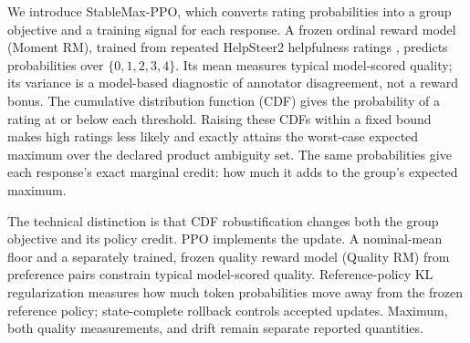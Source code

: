 \documentclass{article}
\newcommand{\method}{StableMax-PPO}
\theoremstyle{definition}
\theoremstyle{remark}
\begin{document}
We introduce \method{}, which converts rating probabilities into a group
objective and a training signal for each response. A frozen ordinal reward
model (Moment RM), trained from repeated HelpSteer2 helpfulness ratings
\citep{wang2024helpsteer2}, predicts probabilities over \(\{0,1,2,3,4\}\).
Its mean measures typical model-scored quality; its variance is a model-based
diagnostic of annotator disagreement, not a reward bonus. The cumulative distribution
function (CDF) gives the probability of a rating at or below each threshold.
Raising these CDFs within a fixed bound makes high ratings less likely and
exactly attains the worst-case expected maximum over the declared product
ambiguity set. The same probabilities give each response's exact marginal
credit: how much it adds to the group's expected maximum.

The technical distinction is that CDF robustification changes both the group
objective and its policy credit. PPO implements the update. A nominal-mean
floor and a separately trained, frozen quality reward model (Quality RM) from
preference pairs constrain typical model-scored quality. Reference-policy KL
regularization measures how much token probabilities move away from the frozen
reference policy; state-complete rollback controls accepted updates. Maximum,
both quality measurements, and drift remain separate reported quantities.
\end{document}

